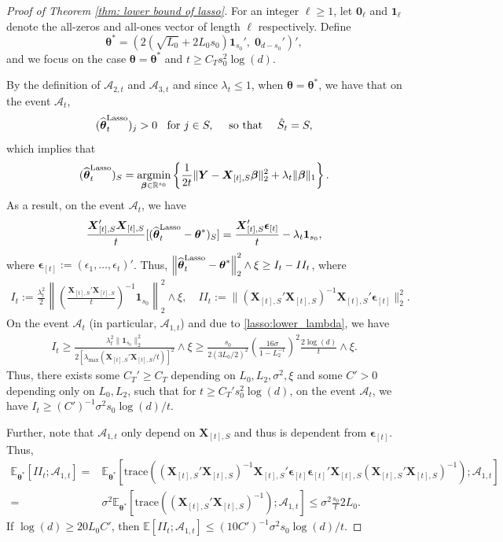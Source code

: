 \documentclass[aos,preprint]{imsart}
\theoremstyle{plain}
\theoremstyle{definition}
\newcommand{\btheta}{\boldsymbol{\theta}}
\newcommand{\bbeta}{\boldsymbol{\beta}}
\newcommand{\bd}[1]{\boldsymbol{#1}}
\newcommand{\hbtheta}{\widehat{\boldsymbol{\theta}}}
\newcommand{\bX}{\boldsymbol{X}}
\DeclareMathOperator*{\argmin}{argmin}
\newcommand{\lmax}[1]{\lambda_{\max}\left(#1\right)}
\newcommand{\ltheta}{\hbtheta^{\textup{Lasso}}}
\newcommand{\bY}{\boldsymbol{Y}}
\newcommand{\bepsilon}{\bd{\epsilon}}
\newcommand{\bR}{\mathbb{R}}
\newcommand{\cA}{\mathcal{A}}
\newcommand{\Exp}{\mathbb{E}}
\begin{document}
\begin{appendix}
\begin{proof}[Proof of Theorem \ref{thm: lower bound of lasso}]
For an integer $\ell \geq 1$, let $\mathbf{0}_{\ell}$  and $\mathbf{1}_{\ell}$  denote the all-zeros and all-ones vector of length $\ell$ respectively. Define
$$
\btheta^*=(2\left( 
    \sqrt{L_0} + 2 L_0 s_0
    \right)  \mathbf{1}_{s_0}',\; \mathbf{0}_{d-s_0}')',
$$
and we focus on the case $\btheta = \btheta^*$ and $t \geq C_T s_0^2\log(d)$.

By the definition of $\cA_{2,t}$ and $\cA_{3,t}$ and since $\lambda_t \leq 1$, when $\btheta = \btheta^*$, we have that on the event $\cA_t$, 
$$
(\ltheta_t)_j > 0 \;\;\text{ for } j \in S,\quad \text{ so that }\quad
\hat{S}_t = S,$$
which implies that 
$$(\ltheta_t)_S = \argmin_{\bbeta \in \bR^{s_0}} \left\{\frac{1}{2t}\|\bY-\bX_{[t],S}\bbeta\|_2^2 + \lambda_t\|\bbeta\|_1 \right\}.$$
As a result, on the event $\cA_t$, we have
$$\frac{\bX_{[t],S}'\bX_{[t],S}}{t}[(\ltheta_t-\btheta^*)_S]=\frac{\bX_{[t],S}'\bepsilon_{[t]}}{t}-\lambda_t\bd{1}_{s_0},
$$
where $\bepsilon_{[t]}:=(\epsilon_1,\ldots,\epsilon_{t})'$. Thus, $\left\|\ltheta_t-\btheta^*\right\|_2^2 \wedge \xi  \ge I_t - II_{t}$, where
\begin{align*}
I_t:=\frac{\lambda_t^2}{2} \left\|\left(\frac{\bX_{[t],S}'\bX_{[t],S}}{t}\right)^{-1}\bd{1}_{s_0}\right\|_2^2 \wedge \xi,\quad
II_{t}:= \|(\bX_{[t],S}'\bX_{[t],S})^{-1}\bX_{[t],S}'\bepsilon_{[t]}\|_2^2.
\end{align*}
On the event $\cA_t$ (in particular, $\cA_{1,t}$) and due to \eqref{lasso:lower_lambda}, we have
\begin{align*}
    I_{t} \ge \frac{\lambda_t^2\|\bd{1}_{s_0}\|_2^2}{2\left[\lmax{\bX_{[t],S}'\bX_{[t],S}/t}\right]^2}\wedge \xi
    \geq \frac{s_0}{2(3L_0/2)^2} \left(\frac{16\sigma}{1-L_2^{-1}}\right)^2 \frac{2\log(d)}{t} \wedge \xi.
\end{align*}
Thus, there exists some $C_T' \geq C_T$   depending on $L_0,L_2, \sigma^2, \xi$ and some $C' > 0$ depending only on $L_0,L_2$, such that for $t \geq C_T' s_0^2\log(d)$, on the event $\cA_t$, we have $I_{t} \geq (C')^{-1}\sigma^2 s_0 \log(d)/t$.

Further, note that $\cA_{1,t}$ only depend on $\bX_{[t],S}$ and thus is dependent from $\bepsilon_{[t]}$. Thus,
\begin{align*}
\Exp_{\btheta^*}[II_t; \cA_{1,t}] = &\Exp_{\btheta^*}\left[
\text{trace}\left((\bX_{[t],S}'\bX_{[t],S})^{-1}\bX_{[t],S}'\bepsilon_{[t]} \bepsilon_{[t]}'\bX_{[t],S}(\bX_{[t],S}'\bX_{[t],S})^{-1} \right); \cA_{1,t}
\right]\\
= &\sigma^2\Exp_{\btheta^*}\left[
\text{trace}\left((\bX_{[t],S}'\bX_{[t],S})^{-1}\right); \cA_{1,t}
\right] \leq \sigma^2 \frac{s_0}{t} 2L_0.
\end{align*}
If $\log(d) \geq 20L_0 C'$, then $\Exp[II_t; \cA_{1,t}] \leq (10C')^{-1} \sigma^2 s_0\log(d)/t$.



\end{proof}
\end{appendix}
\end{document}
